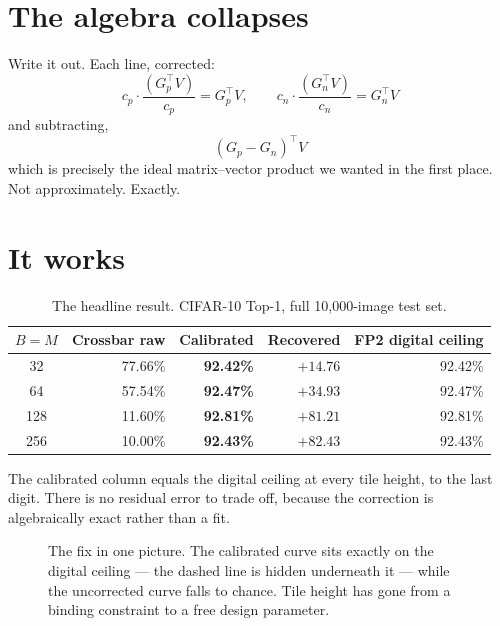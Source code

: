 \documentclass[11pt,a4paper]{report}
\begin{document}
\section{The algebra collapses}

Write it out. Each line, corrected:
\[
c_p \cdot \frac{(G_p^{\!\top}V)}{c_p} = G_p^{\!\top}V,
\qquad
c_n \cdot \frac{(G_n^{\!\top}V)}{c_n} = G_n^{\!\top}V
\]
and subtracting,
\[
\boxed{\;(G_p - G_n)^{\!\top} V\;}
\]
which is precisely the ideal matrix--vector product we wanted in the first
place. Not approximately. Exactly.

\section{It works}

\begin{table}[h]
\centering
\caption{The headline result. CIFAR-10 Top-1, full 10{,}000-image test set.}
\begin{tabular}{crrrr}
\toprule
$B = M$ & Crossbar raw & \textbf{Calibrated} & Recovered & FP2 digital ceiling \\
\midrule
32  & 77.66\% & \textbf{92.42\%} & $+14.76$ & 92.42\% \\
64  & 57.54\% & \textbf{92.47\%} & $+34.93$ & 92.47\% \\
128 & 11.60\% & \textbf{92.81\%} & $+81.21$ & 92.81\% \\
256 & 10.00\% & \textbf{92.43\%} & $+82.43$ & 92.43\% \\
\bottomrule
\end{tabular}
\end{table}

The calibrated column equals the digital ceiling at every tile height, to the
last digit. There is no residual error to trade off, because the correction is
algebraically exact rather than a fit.

\begin{figure}[h]
\centering
{}
\caption{The fix in one picture. The calibrated curve sits exactly on the
digital ceiling --- the dashed line is hidden underneath it --- while the
uncorrected curve falls to chance. Tile height has gone from a binding
constraint to a free design parameter.}
\end{figure}
\end{document}
